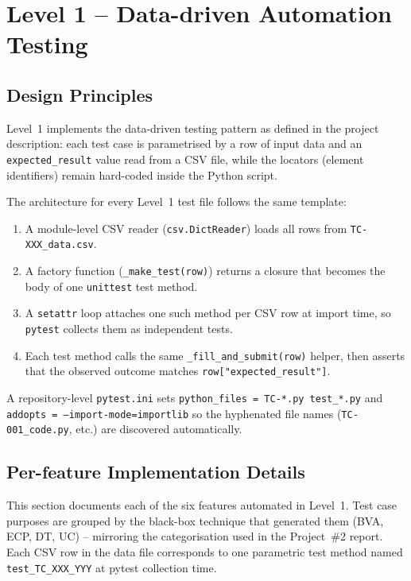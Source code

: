 \documentclass[twoside,final]{hcmut-report}
\begin{document}
\section{Level 1 -- Data-driven Automation Testing}

\subsection{Design Principles}
Level~1 implements the data-driven testing pattern as defined in the project description: each test case is parametrised by a row of input data and an \texttt{expected\_result} value read from a CSV file, while the locators (element identifiers) remain hard-coded inside the Python script.

The architecture for every Level~1 test file follows the same template:
\begin{enumerate}
    \item A module-level CSV reader (\texttt{csv.DictReader}) loads all rows from \texttt{TC-XXX\_data.csv}.
    \item A factory function (\texttt{\_make\_test(row)}) returns a closure that becomes the body of one \texttt{unittest} test method.
    \item A \texttt{setattr} loop attaches one such method per CSV row at import time, so \texttt{pytest} collects them as independent tests.
    \item Each test method calls the same \texttt{\_fill\_and\_submit(row)} helper, then asserts that the observed outcome matches \texttt{row["expected\_result"]}.
\end{enumerate}

A repository-level \texttt{pytest.ini} sets \texttt{python\_files = TC-*.py test\_*.py} and \texttt{addopts = --import-mode=importlib} so the hyphenated file names (\texttt{TC-001\_code.py}, etc.) are discovered automatically.

\subsection{Per-feature Implementation Details}

This section documents each of the six features automated in Level~1. Test
case purposes are grouped by the black-box technique that generated them
(BVA, ECP, DT, UC) -- mirroring the categorisation used in the Project~\#2
report. Each CSV row in the data file corresponds to one parametric test
method named \texttt{test\_TC\_XXX\_YYY} at pytest collection time.
\end{document}
